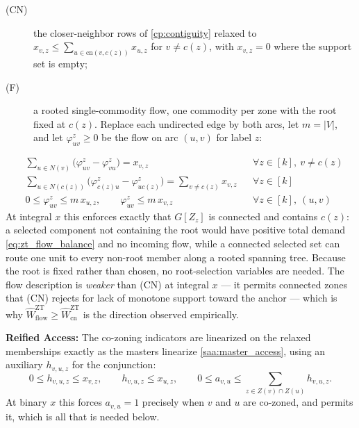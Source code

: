 \documentclass{article}
\begin{document}
\begin{description}
    \item[(CN)] the closer-neighbor rows of \eqref{cp:contiguity} relaxed to $x_{v,z} \leq \sum_{u \in \text{cn}(v, c(z))} x_{u,z}$ for $v \neq c(z)$, with $x_{v,z} = 0$ where the support set is empty;
    \item[(F)] a rooted single-commodity flow, one commodity per zone with the root fixed at $c(z)$. Replace each undirected edge by both arcs, let $m = |V|$, and let $\varphi^z_{uv} \geq 0$ be the flow on arc $(u,v)$ for label $z$:
\end{description}
\begin{align}
& \sum_{u \in N(v)} \big( \varphi^z_{uv} - \varphi^z_{vu} \big) = x_{v,z}
&& \forall z \in [k],\ v \neq c(z) \label{eq:zt_flow_balance} \\
& \sum_{u \in N(c(z))} \big( \varphi^z_{c(z)u} - \varphi^z_{uc(z)} \big)
= \sum_{v \neq c(z)} x_{v,z}
&& \forall z \in [k] \label{eq:zt_flow_supply} \\
& 0 \leq \varphi^z_{uv} \leq m\, x_{u,z}, \qquad \varphi^z_{uv} \leq m\, x_{v,z}
&& \forall z \in [k],\ (u,v) \label{eq:zt_flow_capacity}
\end{align}
At integral $x$ this enforces exactly that $G[Z_z]$ is connected and contains $c(z)$: a selected component not containing the root would have positive total demand \eqref{eq:zt_flow_balance} and no incoming flow, while a connected selected set can route one unit to every non-root member along a rooted spanning tree. Because the root is fixed rather than chosen, no root-selection variables are needed. The flow description is \emph{weaker} than (CN) at integral $x$ --- it permits connected zones that (CN) rejects for lack of monotone support toward the anchor --- which is why $\widehat{W}^{\mathrm{ZT}}_{\mathrm{flow}} \geq \widehat{W}^{\mathrm{ZT}}_{\mathrm{cn}}$ is the direction observed empirically.

\noindent\textbf{Reified Access:}
The co-zoning indicators are linearized on the relaxed memberships exactly as the masters linearize \eqref{saa:master_access}, using an auxiliary $h_{v,u,z}$ for the conjunction:
\begin{equation}\label{eq:zt_access}
0 \leq h_{v,u,z} \leq x_{v,z}, \qquad h_{v,u,z} \leq x_{u,z}, \qquad 0 \leq a_{v,u} \leq \sum_{z \in Z(v) \cap Z(u)} h_{v,u,z} .
\end{equation}
At binary $x$ this forces $a_{v,u} = 1$ precisely when $v$ and $u$ are co-zoned, and permits it, which is all that is needed below.
\end{document}
